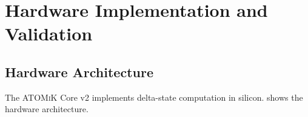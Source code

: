 \documentclass[11pt,letterpaper]{article}
\theoremstyle{plain}
\theoremstyle{definition}
\theoremstyle{remark}
\newcommand{\atomik}{\textsc{ATOMiK}}
\begin{document}
\section{Hardware Implementation and Validation}
\label{sec:hardware}

\subsection{Hardware Architecture}

The \atomik{} Core v2 implements delta-state computation in silicon.  shows the hardware architecture.
\end{document}
